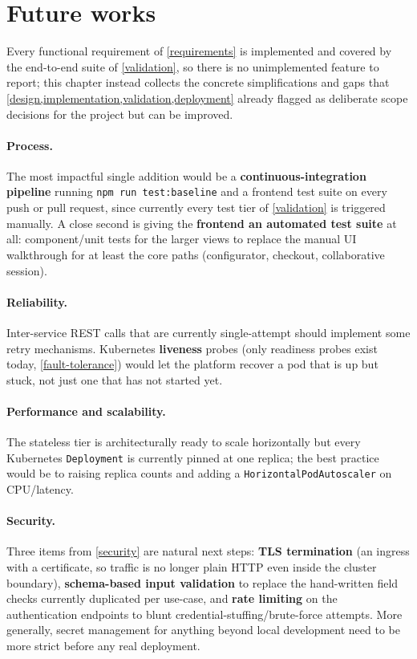 \section{Future works}\label{future-works}

Every functional requirement of \cref{requirements} is implemented and
covered by the end-to-end suite of \cref{validation}, so there is no
unimplemented feature to report; this chapter instead collects the concrete
simplifications and gaps that \cref{design,implementation,validation,deployment}
already flagged as deliberate scope decisions for the project but can be improved.

\paragraph{Process.} The most impactful single addition would be a
\textbf{continuous-integration pipeline} running
\texttt{npm run test:baseline} and a frontend test
suite on every push or pull request, since currently every test tier of
\cref{validation} is triggered manually. A close second is giving the
\textbf{frontend an automated test suite} at all: component/unit tests
for the larger views to replace the manual
UI walkthrough for at least the core paths
(configurator, checkout, collaborative session).

\paragraph{Reliability.} Inter-service REST calls that are currently
single-attempt should implement some retry mechanisms.
Kubernetes \textbf{liveness} probes (only readiness probes exist today,
\cref{fault-tolerance}) would let the platform recover a pod that is up but
stuck, not just one that has not started yet.

\paragraph{Performance and scalability.} The stateless tier is architecturally ready
to scale horizontally but every Kubernetes \texttt{Deployment} is currently
pinned at one replica; the best practice would be to raising replica counts and
adding a \texttt{HorizontalPodAutoscaler} on CPU/latency.

\paragraph{Security.} Three items from \cref{security} are natural next
steps: \textbf{TLS termination}
(an ingress with a certificate, so traffic is no longer plain HTTP even
inside the cluster boundary), \textbf{schema-based input validation}
to replace the hand-written field checks currently duplicated per
use-case, and \textbf{rate limiting} on the authentication endpoints to
blunt credential-stuffing/brute-force attempts. More generally,
secret management for anything beyond local development need to be more strict before any
real deployment.
